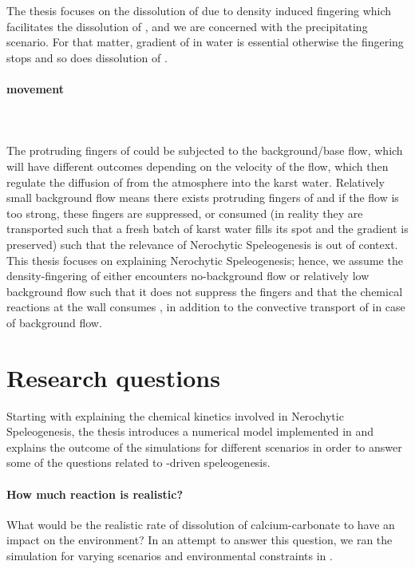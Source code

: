 The thesis focuses on the dissolution of  due to density induced fingering which facilitates the dissolution of , and we are concerned with the precipitating scenario. For that matter, gradient of  in water is essential otherwise the fingering stops and so does dissolution of .

\paragraph*{ movement}\mbox{}\\ \\
The protruding fingers of  could be subjected to the background/base flow, which will have different outcomes depending on the velocity of the flow, which then regulate the diffusion of  from the atmosphere into the karst water. Relatively small background flow means there exists protruding fingers of  and if the flow is too strong, these fingers are suppressed, or consumed (in reality they are transported such that a fresh batch of karst water fills its spot and the gradient is preserved) such that the relevance of Nerochytic Speleogenesis is out of context. \\

This thesis focuses on explaining Nerochytic Speleogenesis; hence, we assume the density-fingering of  either encounters no-background flow or relatively low background flow such that it does not suppress the fingers and that the chemical reactions at the wall consumes , in addition to the convective transport of  in case of background flow.

\section {Research questions}
Starting with explaining the chemical kinetics involved in Nerochytic Speleogenesis, the thesis introduces a numerical model implemented in \DuMuX and explains the outcome of the simulations for different scenarios in order to answer some of the questions related to -driven speleogenesis.\\

\paragraph*{How much reaction is realistic?} What would be the realistic rate of dissolution of calcium-carbonate to have an impact on the environment? In an attempt to answer this question, we ran the simulation for varying scenarios and environmental constraints in \DuMuX. 

